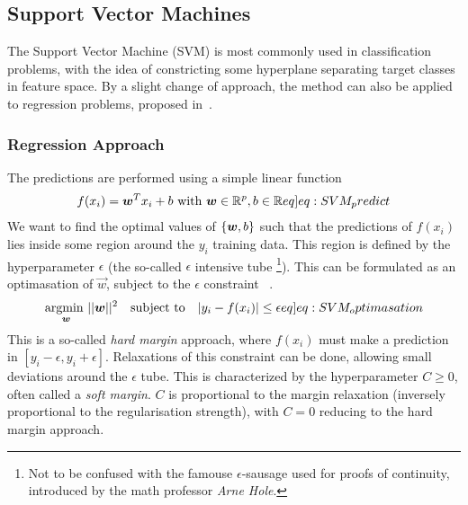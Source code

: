             \subsection{Support Vector Machines}
            The Support Vector Machine (SVM) is most commonly used in classification problems, with the idea of constricting some hyperplane separating target classes in feature space. By a slight change of approach, the method can also be applied to regression problems, proposed in~\citep{SVR}. 
            
                \subsubsection{Regression Approach}
                    The predictions are performed using a simple linear function
                    \begin{align}
                        f(x_i) = \vec{w}^T x_i + b \text{ with } \vec{w} \in \mathbb{R}^p, b \in \mathbb{R} \label[eq]{eq:SVM_predict} 
                    \end{align}
                    We want to find the optimal values of $\{\boldsymbol{w}, b\}$ such that the predictions of $f(x_i)$ lies inside some region around the $y_i$ training data. This region is defined by the hyperparameter $\epsilon$ (the so-called $\epsilon$ intensive tube \footnote{Not to be confused with the famouse $\epsilon$-sausage used for proofs of continuity, introduced by the math professor \textit{Arne Hole}.}). This can be formulated as an optimasation of $\vec{w}$, subject to the $\epsilon$ constraint ~\citep{SVRgood}.  
                    \begin{align}
                        \underset{\vec{w}}{\text{argmin  }}   ||\vec{w}||^2 
                        \hspace{10px}\text{subject to}\hspace{10px} |y_i - f(x_i)| \leq \epsilon \label[eq]{eq:SVM_optimasation}
                    \end{align}
                    This is a so-called \textit{hard margin} approach, where $f(x_i)$ must make a prediction in $[y_i - \epsilon, y_i + \epsilon]$. Relaxations of this constraint can be done, allowing small deviations around the $\epsilon$ tube. This is characterized by the hyperparameter $C \geq 0$, often called a \textit{soft margin}. $C$ is proportional to the margin relaxation (inversely proportional to the regularisation strength), with $C = 0$ reducing to the hard margin approach.  
                
